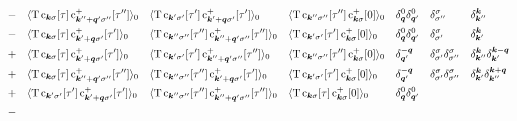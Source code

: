     \begin{align*}
        &-
        && \av{\op T \, \op c_{\vec k \sigma}[\tau]
        \, \op c_{\vec k'' + \vec q' \sigma''}^+[\tau'']}_0
        && \av{\op T \, \op c_{\vec k' \sigma'}[\tau']
        \, \op c_{\vec k' + \vec q \sigma'}^+[\tau']}_0
        && \av{\op T \, \op c_{\vec k'' \sigma''}[\tau'']
        \, \op c_{\vec k \sigma}^+[0]}_0
        && \delta_{\vec q}^0 \delta_{\vec q'}^0
        && \delta_{\sigma''}^\sigma
        && \delta_{\vec k''}^{\vec k} \\
        &-
        && \av{\op T \, \op c_{\vec k \sigma}[\tau]
        \, \op c_{\vec k' + \vec q \sigma'}^+[\tau']}_0
        && \av{\op T \, \op c_{\vec k'' \sigma''}[\tau'']
        \, \op c_{\vec k'' + \vec q' \sigma''}^+[\tau'']}_0
        && \av{\op T \, \op c_{\vec k' \sigma'}[\tau']
        \, \op c_{\vec k \sigma}^+[0]}_0
        && \delta_{\vec q}^0 \delta_{\vec q'}^0
        && \delta_{\sigma'}^\sigma
        && \delta_{\vec k'}^{\vec k} \\
        &+
        && \av{\op T \, \op c_{\vec k \sigma}[\tau]
        \, \op c_{\vec k' + \vec q \sigma'}^+[\tau']}_0
        && \av{\op T \, \op c_{\vec k' \sigma'}[\tau']
        \, \op c_{\vec k'' + \vec q' \sigma''}^+[\tau'']}_0
        && \av{\op T \, \op c_{\vec k'' \sigma''}[\tau'']
        \, \op c_{\vec k \sigma}^+[0]}_0
        && \delta_{\vec q'}^{-\vec q}
        && \delta_{\sigma'}^\sigma \delta_{\sigma''}^\sigma
        && \delta_{\vec k''}^{\vec k} \delta_{\vec k'}^{\vec k - \vec q} \\
        &+
        && \av{\op T \, \op c_{\vec k \sigma}[\tau]
        \, \op c_{\vec k'' + \vec q' \sigma''}^+[\tau'']}_0
        && \av{\op T \, \op c_{\vec k'' \sigma''}[\tau'']
        \, \op c_{\vec k' + \vec q \sigma'}^+[\tau']}_0
        && \av{\op T \, \op c_{\vec k' \sigma'}[\tau']
        \, \op c_{\vec k \sigma}^+[0]}_0
        && \delta_{\vec q'}^{-\vec q}
        && \delta_{\sigma'}^\sigma \delta_{\sigma''}^\sigma
        && \delta_{\vec k'}^{\vec k} \delta_{\vec k''}^{\vec k + \vec q} \\
        &+
        && \av{\op T \, \op c_{\vec k' \sigma'}[\tau']
        \, \op c_{\vec k' + \vec q \sigma'}^+[\tau']}_0
        && \av{\op T \, \op c_{\vec k'' \sigma''}[\tau'']
        \, \op c_{\vec k'' + \vec q' \sigma''}^+[\tau'']}_0
        && \av{\op T \, \op c_{\vec k \sigma}[\tau]
        \, \op c_{\vec k \sigma}^+[0]}_0
        && \delta_{\vec q}^0 \delta_{\vec q'}^0
        &&
        && \\
        &-

\end{align*}
